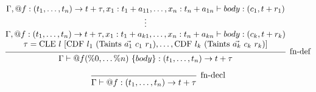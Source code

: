 \documentclass{article}
\begin{document}
\[
\begin{prooftree}
    \hypo{
    \begin{matrix}
        \Gamma, @f : (t_1, \ldots, t_n) \rightarrow t + \tau, x_1 : t_1 + a_{11}, \ldots, x_n: t_n + a_{1n} \vdash body : (c_1, t + r_1) \\
        \vdots \\
        \Gamma, @f : (t_1, \ldots, t_n) \rightarrow t + \tau, x_1 : t_1 + a_{k1}, \ldots, x_n: t_n + a_{kn} \vdash body : (c_k, t + r_k) \\
        \tau = \text{CLE}\ l\ [\text{CDF}\ l_1\ (\text{Taints}\ \vec{a_1}\ c_1\ r_1), \dots, \text{CDF}\ l_k\ (\text{Taints}\ \vec{a_k}\ c_k\ r_k)]
    \end{matrix}
    }
    \infer1[fn-def]{\Gamma \vdash @f(\%0, \dots \%n)\ \{ body \} : (t_1, \ldots, t_n) \rightarrow t + \tau}
\end{prooftree}
\]

\[
\begin{prooftree}
    \infer0[fn-decl]{\Gamma \vdash @f : (t_1, \ldots, t_n) \rightarrow t + \tau}
\end{prooftree}
\]


\begin{comment}
\infer{\Gamma \vdash i : \tau}{%
    \Gamma\vdash hasFunction(i) \neq \varnothing 
    & \deduce{
        \Gamma, arg_0 : \tau, \dots, arg_n : \tau \vdash
        \forall j. hasSource(j) = i \implies j : \tau 
        }{
        \Gamma \vdash hasParam(i, arg_{0\dots n}) = true
        }
}
\end{comment}
\end{document}
